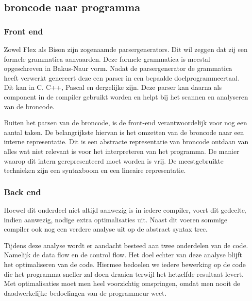 \documentclass[11pt,a4paper]{article}
\begin{document}
\subsection{broncode naar programma}

\subsubsection{Front end}
Zowel Flex als Bison zijn zogenaamde parsergenerators. Dit wil zeggen dat zij een formele grammatica aanvaarden. Deze formele grammatica is meestal opgeschreven in Bakus-Naur vorm. Nadat de parsergenerator de grammatica heeft verwerkt genereert deze een parser in een bepaalde doelprogrammeertaal. Dit kan in C, C++, Pascal en dergelijke zijn. Deze parser kan daarna als component in de compiler gebruikt worden en helpt bij het scannen en analyseren van de broncode.

Buiten het parsen van de broncode, is de front-end verantwoordelijk voor nog een aantal taken. De belangrijkste hiervan is het omzetten van de broncode naar een interne representatie. Dit is een abstracte representatie van broncode ontdaan van alles wat niet relevant is voor het interpreteren van het programma. De manier waarop dit intern gerepresenteerd moet worden is vrij. De meestgebruikte technieken zijn een syntaxboom en een lineaire representatie. 

\subsubsection{Back end}
Hoewel dit onderdeel niet altijd aanwezig is in iedere compiler, voert dit gedeelte, indien aanwezig, nodige extra optimalisaties uit. Naast dit voeren sommige compiler ook nog een verdere analyse uit op de abstract syntax tree.

Tijdens deze analyse wordt er aandacht besteed aan twee onderdelen van de code. Namelijk de data flow en de control flow. Het doel echter van deze analyse blijft het optimaliseren van de code. Hiermee bedoelen we iedere bewerking op de code die het programma sneller zal doen draaien terwijl het hetzelfde resultaat levert. Met optimalisaties moet men heel voorzichtig omspringen, omdat men nooit de daadwerkelijke bedoelingen van de programmeur weet.
\end{document}
